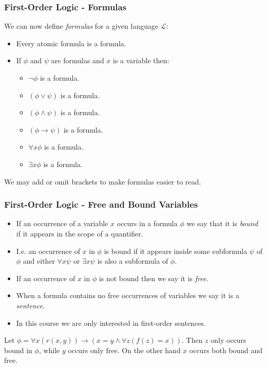 \documentclass[handout]{beamer}
\newcommand{\ra}{\rightarrow}
\begin{document}
\begin{frame}
\frametitle{First-Order Logic - Formulas}
We can now define \emph{formulas} for a given language $\mathscr{L}$:
\vspace{0.5cm}
\begin{itemize}
\item Every atomic formula is a formula.
\vspace{0.5cm}
\item If $\phi$ and $\psi$ are formulas and $x$ is a variable then:
\vspace{0.3cm}
\begin{itemize}
\item $\neg \phi$ is a formula.
\vspace{0.3cm}
\item $(\phi\vee \psi)$ is a formula.
\vspace{0.3cm}
\item $(\phi\wedge \psi)$ is a formula.
\vspace{0.3cm}
\item $(\phi\ra \psi)$ is a formula.
\vspace{0.3cm}
\item $\forall x\phi$ is a formula.
\vspace{0.3cm}
\item $\exists x\phi$ is a formula.
\end{itemize}
\end{itemize}
We may add or omit brackets to make formulas easier to read.
\end{frame}

\begin{frame}
\frametitle{First-Order Logic - Free and Bound Variables}
\begin{itemize}
\item If an occurrence of a variable $x$ occurs in a formula $\phi$ we say that it is \emph{bound} if it appears in the scope of a quantifier. 
\item I.e. an occurrence of $x$ in $\phi$ is bound if it appears inside some subformula $\psi$ of $\phi$ and either $\forall x \psi$ or $\exists x \psi$ is also a subformula of $\phi$. 
\item If an occurrence of $x$ in $\phi$ is not bound then we say it is \emph{free}. 
\item When a formula contains no free occurrences of variables we say it is a \emph{sentence}. 
\item In this course we are only interested in first-order sentences. 
\end{itemize}
\begin{example}
Let $\phi=\forall x (r(x,y))\ra (x=y\wedge \forall z(f(z)=x))$. Then $z$ only occurs bound in $\phi$, while $y$ occurs only free. On the other hand $x$ occurs both bound and free.
\end{example}
\end{frame}
\end{document}

